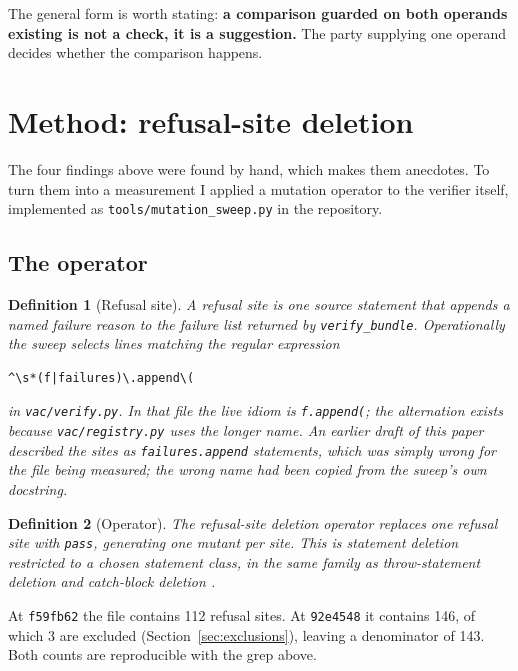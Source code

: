 \documentclass[11pt]{article}
\newtheorem{definition}{Definition}
\begin{document}
The general form is worth stating: \textbf{a comparison guarded on both operands existing is
not a check, it is a suggestion.} The party supplying one operand decides whether the
comparison happens.

\section{Method: refusal-site deletion}
\label{sec:method}

The four findings above were found by hand, which makes them anecdotes. To turn them into a
measurement I applied a mutation operator to the verifier itself, implemented as
\texttt{tools/mutation\_sweep.py} in the repository.

\subsection{The operator}

\begin{definition}[Refusal site]
A \emph{refusal site} is one source statement that appends a named failure reason to the
failure list returned by \texttt{verify\_bundle}. Operationally the sweep selects lines
matching the regular expression
\begin{Verbatim}[fontsize=\small]
^\s*(f|failures)\.append\(
\end{Verbatim}
in \texttt{vac/verify.py}. In that file the live idiom is \texttt{f.append(}; the
alternation exists because \texttt{vac/registry.py} uses the longer name. An earlier draft
of this paper described the sites as \texttt{failures.append} statements, which was simply
wrong for the file being measured; the wrong name had been copied from the sweep's own
docstring.
\end{definition}

\begin{definition}[Operator]
The \emph{refusal-site deletion} operator replaces one refusal site with \texttt{pass},
generating one mutant per site. This is statement deletion \citep{untch2009sdl,deng2013sdl}
restricted to a chosen statement class, in the same family as throw-statement deletion
\citep{kumar2011mutants} and catch-block deletion \citep{ji2009exception}.
\end{definition}

At \texttt{f59fb62} the file contains 112 refusal sites. At \texttt{92e4548} it contains 146,
of which 3 are excluded (Section~\ref{sec:exclusions}), leaving a denominator of 143. Both
counts are reproducible with the grep above.
\end{document}
